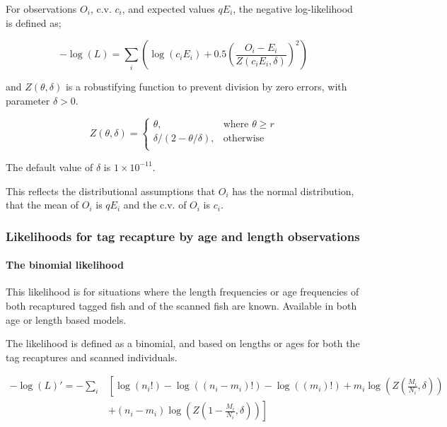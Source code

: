 For observations $O_i$, c.v. $c_i$, and expected values $qE_i$, the negative log-likelihood is defined as;

\begin{equation}
- \log \left(L \right) = \sum\limits_i \left( \log \left( c_i E_i \right) +0.5 \left( \frac{O_i-E_i}{Z\left(c_i E_i,\delta \right)}\right)^2\right)
\end{equation}

and $Z \left(\theta,\delta \right)$ is a robustifying function to prevent division by zero errors, with parameter $\delta>0$.

\begin{equation}
Z \left(\theta,\delta \right) = \begin{cases}
\theta, & \text{where $\theta \ge r$} \\
\delta/\left( 2-\theta/\delta \right), & \text{otherwise} \\
\end{cases}
\end{equation}

The default value of $\delta$ is $1 \times 10^{-11}$.

This reflects the distributional assumptions that  $O_i$ has the normal distribution, that the mean of $O_i$ is $qE_i$  and the c.v. of $O_i$ is $c_i$.

\subsubsection{Likelihoods for tag recapture by age and length observations}
\paragraph*{The binomial likelihood}

This likelihood is for situations where the length frequencies or age frequencies of both recaptured tagged fish and of the scanned fish are known. Available in both age or length based models.

The likelihood is defined as a binomial, and based on lengths or ages for both the tag recaptures and scanned individuals. 

\begin{equation}
\begin{split}
-\log \left(L \right)'= -\sum\limits_i & \left[ \right. \log \left(n_i! \right) - \log \left(\left(n_i - m_i \right)! \right) - \log \left(\left(m_i \right)! \right) + m_i \log \left(Z\left(\frac{M_i}{N_i},\delta \right) \right) \\
&+  \left(n_i - m_i \right)\log \left(Z\left(1 - \frac{M_i}{N_i},\delta\right) \right) \left. \right]
\end{split}
\end{equation}

